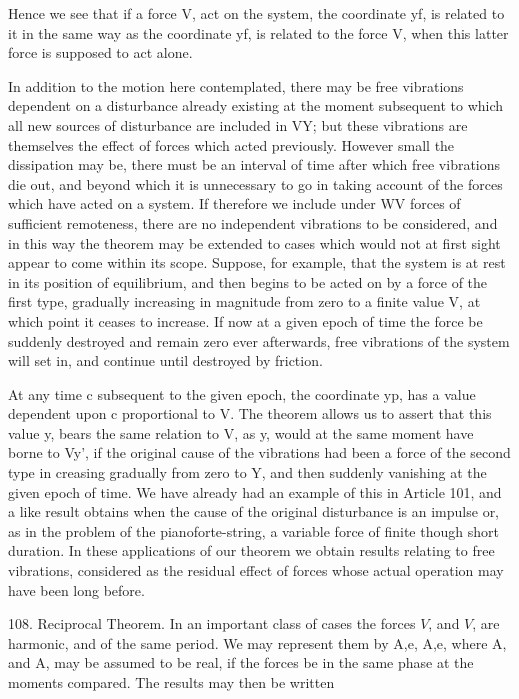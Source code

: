 Hence we see that if a force V, act on the system, the coordinate yf, is
related to it in the same way as the coordinate yf, is related to the force V,
when this latter force is supposed to act alone.

In addition to the motion here contemplated, there may be free vibrations
dependent on a disturbance already existing at the moment subsequent to which
all new sources of disturbance are included in VY; but these vibrations are
themselves the effect of forces which acted previously. However small the
dissipation may be, there must be an interval of time after which free
vibrations die out, and beyond which it is unnecessary to go in taking account
of the forces which have acted on a system. If therefore we include under WV
forces of sufficient remoteness, there are no independent vibrations to be
considered, and in this way the theorem may be extended to cases which would
not at first sight appear to come within its scope. Suppose, for example, that
the system is at rest in its position of equilibrium, and then begins to be
acted on by a force of the first type, gradually increasing in magnitude from
zero to a finite value V, at which point it ceases to increase. If now at a
given epoch of time the force be suddenly destroyed and remain zero ever
afterwards, free vibrations of the system will set in, and continue until
destroyed by friction.

At any time c subsequent to the given epoch, the coordinate yp, has a value
dependent upon c proportional to V. The theorem allows us to assert that this
value y, bears the same relation to V, as y, would at the same moment have borne
to Vy', if the original cause of the vibrations had been a force of the second
type in creasing gradually from zero to Y, and then suddenly vanishing at the
given epoch of time. We have already had an example of this in Article 101, and
a like result obtains when the cause of the original disturbance is an impulse
or, as in the problem of the pianoforte-string, a variable force of finite
though short duration.  In these applications of our theorem we obtain results
relating to free vibrations, considered as the residual effect of forces whose
actual operation may have been long before.


108. Reciprocal Theorem.  In an important class of cases the forces
\(V\), and \(V\), are harmonic, and of
the same period. We may represent them by A,e, A,e, where A, and A, may be
assumed to be real, if the forces be in the same phase at the moments compared.
The results may then be written

